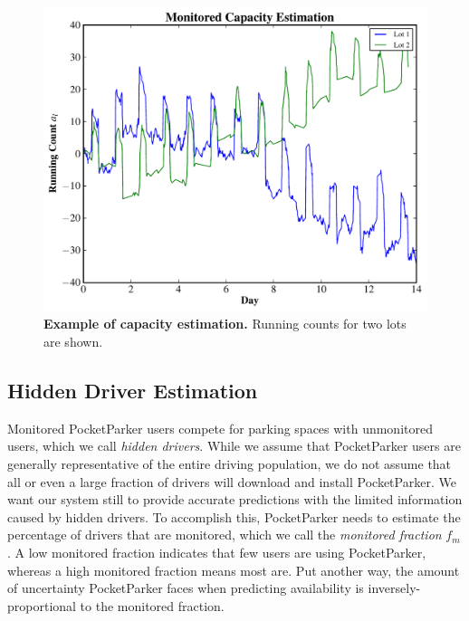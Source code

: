 \begin{figure}
\centering
\includegraphics[width=\columnwidth]{./simulator/figures/capacity.pdf}

\caption{\textbf{Example of capacity estimation.} Running counts for two lots
are shown.}

\vspace*{-0.2in}
\label{fig-capacityexample}
\end{figure}

\subsection{Hidden Driver Estimation}
\label{subsec-hidden}

Monitored PocketParker users compete for parking spaces with unmonitored
users, which we call \textit{hidden drivers}. While we assume that
PocketParker users are generally representative of the entire driving
population, we do not assume that all or even a large fraction of drivers
will download and install PocketParker. We want our system still to provide
accurate predictions with the limited information caused by hidden drivers.
To accomplish this, PocketParker needs to estimate the percentage of drivers
that are monitored, which we call the \textit{monitored fraction} $f_m$. A
low monitored fraction indicates that few users are using PocketParker,
whereas a high monitored fraction means most are. Put another way, the amount
of uncertainty PocketParker faces when predicting availability is
inversely-proportional to the monitored fraction.

